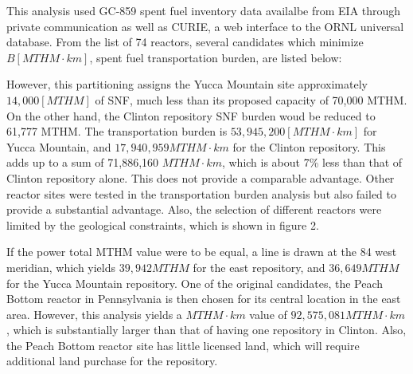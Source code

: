 This analysis used GC-859 spent fuel inventory data availalbe from \gls{EIA} 
through private communication \cite{domenico_GC-859_2016} as well as \gls{CURIE}, a web interface to 
the \gls{ORNL} universal database\cite{ornl_centralized_2016}.
From the list of 74 reactors, several candidates which minimize $B [MTHM\cdot 
km]$, spent fuel transportation burden, are listed below:
    
\begin{table}[h]
\centering

        \caption { Reactors with relatively small spent fuel transportation burden $ [MTHM\cdot km]$.}
\end {table}


However, this partitioning assigns the Yucca Mountain site approximately 
$14,000 [MTHM]$ of \gls{SNF}, much less than its proposed capacity of 70,000 MTHM. On the other hand, 
the Clinton repository \gls{SNF} burden woud be reduced to 61,777 MTHM. The transportation burden is 
$53,945,200 [MTHM\cdot km]$  
for Yucca Mountain, and $17,940,959 MTHM\cdot km$ for the Clinton repository. This 
adds up to a sum of 71,886,160 $MTHM\cdot km$, which is about 7\% less than that
of Clinton repository alone. This does not provide a comparable advantage. Other
reactor sites were tested in the transportation burden analysis but also failed
to provide a substantial advantage. Also, the selection of different reactors
were limited by the geological constraints, which is shown in figure 2.  

If the power total MTHM value were to be equal, a line is drawn at the 84 west
meridian, which yields $39,942 MTHM$ for the east repository, and $36,649 MTHM$ for
the Yucca Mountain repository. One of the original candidates, the Peach Bottom
reactor in Pennsylvania is then chosen for its central location in the east area.
However, this analysis yields a $MTHM\cdot km$ value of $92,575,081 MTHM\cdot km$,
which is substantially larger than that of having one repository in Clinton. 
Also, the Peach Bottom reactor site has little licensed land, which will require
additional land purchase for the repository. 

